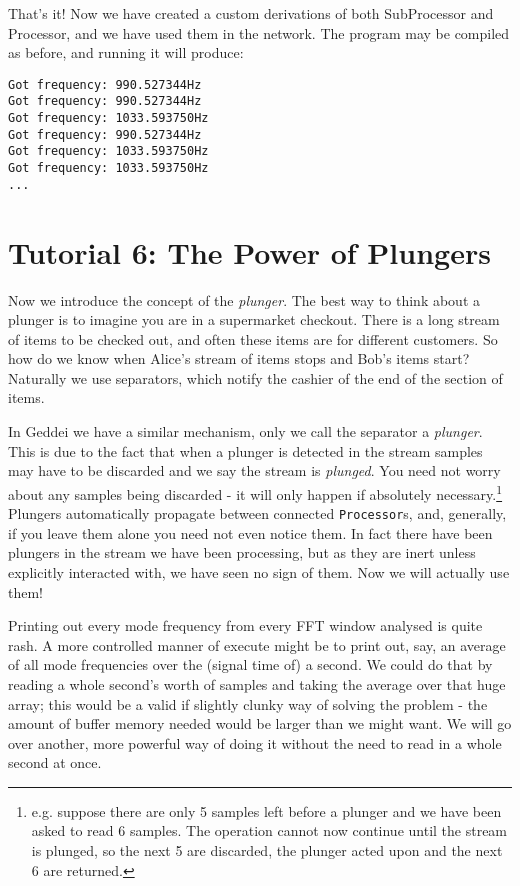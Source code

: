 That's it! Now we have created a custom derivations of both SubProcessor and Processor, and we have used them in the network. The program may be compiled as before, and running it will produce:

\begin{verbatim}
Got frequency: 990.527344Hz
Got frequency: 990.527344Hz
Got frequency: 1033.593750Hz
Got frequency: 990.527344Hz
Got frequency: 1033.593750Hz
Got frequency: 1033.593750Hz
...
\end{verbatim}




\section{Tutorial 6: The Power of Plungers}

Now we introduce the concept of the \textit{plunger}. The best way to think about a plunger is to imagine you are in a supermarket checkout. There is a long stream of items to be checked out, and often these items are for different customers. So how do we know when Alice's stream of items stops and Bob's items start? Naturally we use separators, which notify the cashier of the end of the section of items.

In Geddei we have a similar mechanism, only we call the separator a \textit{plunger}. This is due to the fact that when a plunger is detected in the stream samples may have to be discarded and we say the stream is \textit{plunged}. You need not worry about any samples being discarded - it will only happen if absolutely necessary.\footnote{e.g. suppose there are only 5 samples left before a plunger and we have been asked to read 6 samples. The operation cannot now continue until the stream is plunged, so the next 5 are discarded, the plunger acted upon and the next 6 are returned.} Plungers automatically propagate between connected \texttt{Processor}s, and, generally, if you leave them alone you need not even notice them. In fact there have been plungers in the stream we have been processing, but as they are inert unless explicitly interacted with, we have seen no sign of them. Now we will actually use them!

Printing out every mode frequency from every FFT window analysed is quite rash. A more controlled manner of execute might be to print out, say, an average of all mode frequencies over the (signal time of) a second. We could do that by reading a whole second's worth of samples and taking the average over that huge array; this would be a valid if slightly clunky way of solving the problem - the amount of buffer memory needed would be larger than we might want. We will go over another, more powerful  way of doing it without the need to read in a whole second at once.

